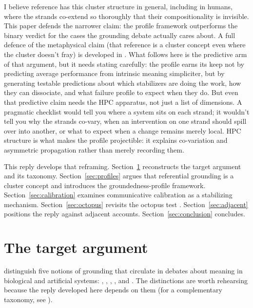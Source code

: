 \documentclass[12pt]{article}
\begin{document}
I believe reference has this cluster structure in general, including in humans, where the strands co-extend so thoroughly that their compositionality is invisible. This paper defends the narrower claim: the profile framework outperforms the binary verdict for the cases the grounding debate actually cares about. A full defence of the metaphysical claim (that reference is a cluster concept even where the cluster doesn't fray) is developed in \textcite{reynolds2026vectors}. What follows here is the predictive arm of that argument, but it needs stating carefully: the profile earns its keep not by predicting average performance from intrinsic meaning simpliciter, but by generating testable predictions about which stabilizers are doing the work, how they can dissociate, and what failure profile to expect when they do. But even that predictive claim needs the HPC apparatus, not just a list of dimensions. A pragmatic checklist would tell you where a system sits on each strand; it wouldn't tell you why the strands co-vary, when an intervention on one strand should spill over into another, or what to expect when a change remains merely local. HPC structure is what makes the profile projectible: it explains co-variation and asymmetric propagation rather than merely recording them.

This reply develops that reframing. Section~\ref{sec:target} reconstructs the target argument and its taxonomy. Section~\ref{sec:profiles} argues that referential grounding is a cluster concept and introduces the groundedness-profile framework. Section~\ref{sec:calibration} examines communicative calibration as a stabilizing mechanism. Section~\ref{sec:octopus} revisits the octopus test \citep{bender_koller_2020_climbing_towards_nlu}. Section~\ref{sec:adjacent} positions the reply against adjacent accounts. Section~\ref{sec:conclusion} concludes.

\section{The target argument}
\label{sec:target}

\textcite{coelho_mollo_milliere_2026_vector_grounding_problem} distinguish five notions of grounding that circulate in debates about meaning in biological and artificial systems: , , , , and . The distinctions are worth rehearsing because the reply developed here depends on them (for a complementary taxonomy, see \citealt{pavlick_2023_symbols_and_grounding_llms}).
\end{document}
